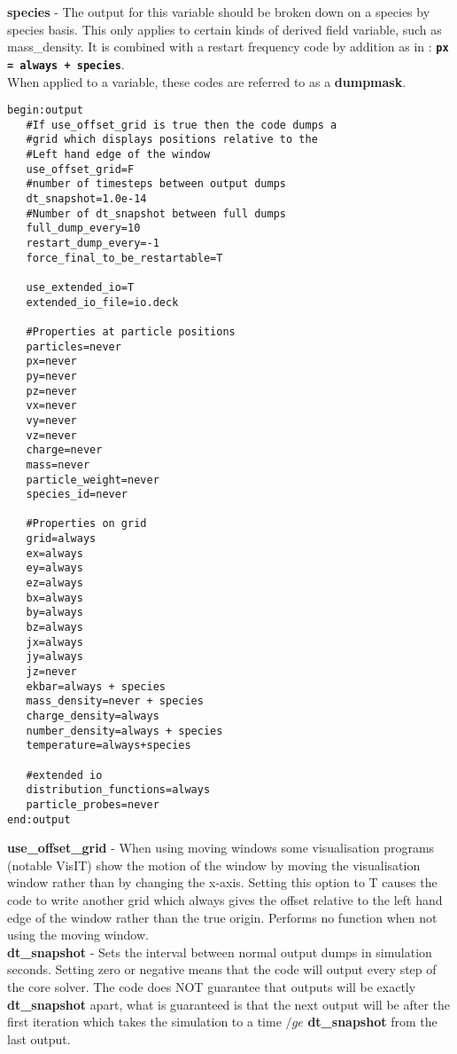 \documentclass[12pt]{article}
\newcommand{\emphtext}{\color{warwickdark} \fontfamily{phv}\selectfont\Large\bf}
\newcommand{\inlineemph}{\color{warwicklight} \bf}
\newcommand{\boxverbatim}[1]{\begin{Verbatim}[obeytabs=true,frame=single,
  framerule=0.5mm,rulecolor=\color{warwickmid},label=#1]}
\newcommand{\inlinecode}[1]{{\color{warwickred} \bf\texttt{#1}}}
\begin{document}
{\emphtext species} - The output for this variable should be broken down on a
species by species basis. This only applies to certain kinds of derived field
variable, such as mass\_density. It is combined with a restart frequency code
by addition as in : \inlinecode{px = always + species}.\\

When applied to a variable, these codes are referred to as a {\inlineemph
dumpmask}.\\

\pagebreak

\boxverbatim{output block}
begin:output
   #If use_offset_grid is true then the code dumps a
   #grid which displays positions relative to the
   #Left hand edge of the window
   use_offset_grid=F
   #number of timesteps between output dumps
   dt_snapshot=1.0e-14
   #Number of dt_snapshot between full dumps
   full_dump_every=10
   restart_dump_every=-1
   force_final_to_be_restartable=T

   use_extended_io=T
   extended_io_file=io.deck

   #Properties at particle positions
   particles=never
   px=never
   py=never
   pz=never
   vx=never
   vy=never
   vz=never
   charge=never
   mass=never
   particle_weight=never
   species_id=never

   #Properties on grid
   grid=always
   ex=always
   ey=always
   ez=always
   bx=always
   by=always
   bz=always
   jx=always
   jy=always
   jz=never
   ekbar=always + species
   mass_density=never + species
   charge_density=always
   number_density=always + species
   temperature=always+species

   #extended io
   distribution_functions=always
   particle_probes=never
end:output
\end{Verbatim}

{\emphtext use\_offset\_grid} - When using moving windows some visualisation
programs (notable VisIT) show the motion of the window by moving the
visualisation window rather than by changing the x-axis. Setting this option to
T causes the code to write another grid which always gives the offset relative
to the left hand edge of the window rather than the true origin. Performs no
function when not using the moving window.\\

{\emphtext dt\_snapshot} - Sets the interval between normal output dumps in
simulation seconds. Setting zero or negative means that the code will output
every step of the core solver. The code does NOT guarantee that outputs will be
exactly {\inlineemph dt\_snapshot} apart, what is guaranteed is that the next
output will be after the first iteration which takes the simulation to a time
$/ge$ {\inlineemph dt\_snapshot} from the last output.\\
\end{document}
